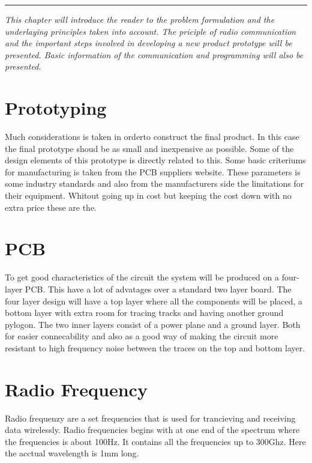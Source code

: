 \vspace{-10ex}%
\rule{\textwidth}{0.3pt}
\vspace{5ex}

\textit{
This chapter will introduce the reader to the problem formulation and the underlaying principles taken into account. The priciple of radio communication and the important steps involved in developing a new product prototype will be presented. Basic information of the communication and programming will also be presented. 
}
\vspace{5ex}



\section{Prototyping}
Much considerations is taken in orderto construct the final product. In this case the final prototype shoud be as small and inexpensive as possible. Some of the design elements of this prototype is directly related to this. Some basic criteriums for manufacturing is taken from the PCB suppliers website. These parameters is some industry standards and also from the manufacturers side the limitations for their equipment. Whitout going up in cost but keeping the cost down with no extra price these are the.



\section{PCB}
To get good characteristics of the circuit the system will be produced on a four-layer PCB. This have a lot of advatages over a standard two layer board. The four layer design will have a top layer where all the components will be placed, a bottom layer with extra room for tracing tracks and having another ground pylogon. The two inner layers consist of a power plane and a ground layer. Both for easier connecability and also as a good way of making the circuit more resistant to high frequency noise between the traces on the top and bottom layer.



\section{Radio Frequency}
Radio frequenzy are a set frequencies that is used for trancieving and receiving data wirelessly. Radio frequencies begins with at one end of the spectrum where the frequencies is about 100Hz. It contains all the frequencies up to 300Ghz. Here the acctual wavelength is 1mm long.

